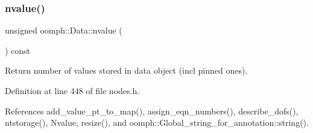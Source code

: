 \mbox{\label{classoomph_1_1Data_a7e67fc78a2e8a2fd6eb75bd292d42ff8}} 
\subsubsection{\texorpdfstring{nvalue()}{nvalue()}}
{\footnotesize\ttfamily unsigned oomph\+::\+Data\+::nvalue (\begin{DoxyParamCaption}{ }\end{DoxyParamCaption}) const\hspace{0.3cm}{\ttfamily [inline]}}



Return number of values stored in data object (incl pinned ones). 



Definition at line 448 of file nodes.\+h.



References add\+\_\+value\+\_\+pt\+\_\+to\+\_\+map(), assign\+\_\+eqn\+\_\+numbers(), describe\+\_\+dofs(), ntstorage(), Nvalue, resize(), and oomph\+::\+Global\+\_\+string\+\_\+for\+\_\+annotation\+::string().



